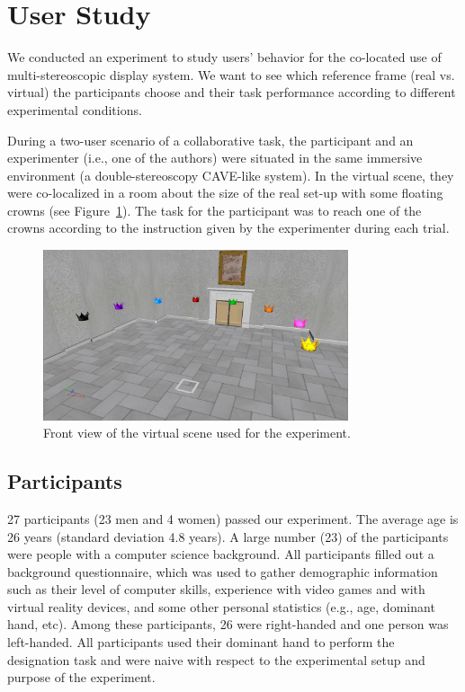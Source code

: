 \section{User Study}
We conducted an experiment to study users' behavior for the co-located use of multi-stereoscopic display system. We want to see which reference frame (real vs. virtual) the participants choose and their task performance according to different experimental conditions.

During a two-user scenario of a collaborative task, the participant and an experimenter (i.e., one of the authors) were situated in the same immersive environment (a double-stereoscopy CAVE-like system). In the virtual scene, they were co-localized in a room about the size of the real set-up with some floating crowns (see Figure~\ref{fig:2_virtual_room}). The task for the participant was to reach one of the crowns according to the instruction given by the experimenter during each trial.

\begin{figure}[ht]
  \centering
  \includegraphics[width=0.8\textwidth]{figures/2_virtual_room}
  \caption{\label{fig:2_virtual_room}Front view of the virtual scene used for the experiment.}
\end{figure}

\subsection{Participants}
27 participants (23 men and 4 women) passed our experiment. The average age is 26 years (standard deviation 4.8 years).
A large number (23) of the participants were people with a computer science background. All participants filled out a background questionnaire, which was used to gather demographic information such as their level of computer skills, experience with video games and with virtual reality devices, and some other personal statistics (e.g., age, dominant hand, etc). Among these participants, 26 were right-handed and one person was left-handed. All participants used their dominant hand to perform the designation task and were naive with respect to the experimental setup and purpose of the experiment.

